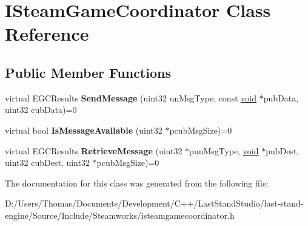 \hypertarget{classISteamGameCoordinator}{}\section{I\+Steam\+Game\+Coordinator Class Reference}
\label{classISteamGameCoordinator}
\subsection*{Public Member Functions}
\begin{DoxyCompactItemize}
\item 
\hypertarget{classISteamGameCoordinator_ad7d6f6607739bcb8472663c6f5f3a88a}{}virtual E\+G\+C\+Results {\bfseries Send\+Message} (uint32 un\+Msg\+Type, const \hyperlink{SDL__audio_8h_a52835ae37c4bb905b903cbaf5d04b05f}{void} $\ast$pub\+Data, uint32 cub\+Data)=0\label{classISteamGameCoordinator_ad7d6f6607739bcb8472663c6f5f3a88a}

\item 
\hypertarget{classISteamGameCoordinator_a7f94e0837dfc4d68eb642c7f7068c80d}{}virtual bool {\bfseries Is\+Message\+Available} (uint32 $\ast$pcub\+Msg\+Size)=0\label{classISteamGameCoordinator_a7f94e0837dfc4d68eb642c7f7068c80d}

\item 
\hypertarget{classISteamGameCoordinator_a332264ad3ba309a2f003cb84002b5245}{}virtual E\+G\+C\+Results {\bfseries Retrieve\+Message} (uint32 $\ast$pun\+Msg\+Type, \hyperlink{SDL__audio_8h_a52835ae37c4bb905b903cbaf5d04b05f}{void} $\ast$pub\+Dest, uint32 cub\+Dest, uint32 $\ast$pcub\+Msg\+Size)=0\label{classISteamGameCoordinator_a332264ad3ba309a2f003cb84002b5245}

\end{DoxyCompactItemize}


The documentation for this class was generated from the following file\+:\begin{DoxyCompactItemize}
\item 
D\+:/\+Users/\+Thomas/\+Documents/\+Development/\+C++/\+Last\+Stand\+Studio/last-\/stand-\/engine/\+Source/\+Include/\+Steamworks/isteamgamecoordinator.\+h\end{DoxyCompactItemize}
